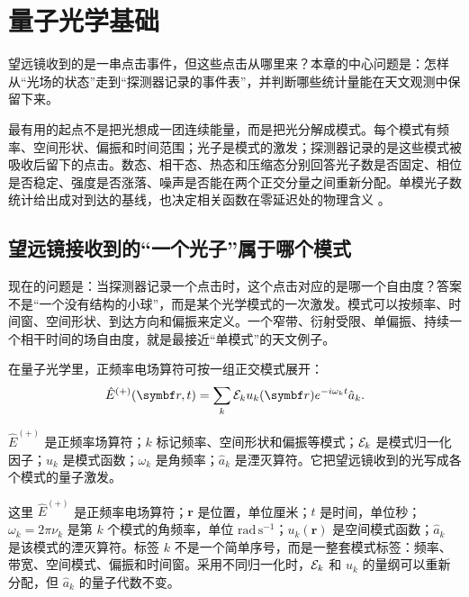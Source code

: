 \chapter{量子光学基础}
\label{chap:03}

\begin{chapteropening}
望远镜收到的是一串点击事件，但这些点击从哪里来？本章的中心问题是：怎样从“光场的状态”走到“探测器记录的事件表”，并判断哪些统计量能在天文观测中保留下来。

最有用的起点不是把光想成一团连续能量，而是把光分解成模式。每个模式有频率、空间形状、偏振和时间范围；光子是模式的激发；探测器记录的是这些模式被吸收后留下的点击。数态、相干态、热态和压缩态分别回答光子数是否固定、相位是否稳定、强度是否涨落、噪声是否能在两个正交分量之间重新分配。单模光子数统计给出成对到达的基线，也决定相关函数在零延迟处的物理含义 \citep{1963PhRv..130.2529G,1963PhRv..131.2766G,1965RvMP...37..231M,1995ocqo.book.....M,1997quop.book.....S,2001qops.book.....S,2013quop.book.....A}。
\end{chapteropening}

\section{望远镜接收到的“一个光子”属于哪个模式}

现在的问题是：当探测器记录一个点击时，这个点击对应的是哪一个自由度？答案不是“一个没有结构的小球”，而是某个光学模式的一次激发。模式可以按频率、时间窗、空间形状、到达方向和偏振来定义。一个窄带、衍射受限、单偏振、持续一个相干时间的场自由度，就是最接近“单模式”的天文例子。

在量子光学里，正频率电场算符可按一组正交模式展开：
\begin{equation}
  \hat E^{(+)}(\bm{r},t)=\sum_k {\cal E}_k u_k(\bm{r})e^{-i\omega_k t}\hat a_k .
  \label{eq:ch03-field-expansion}
\end{equation}
\begin{formulaexplain}
\(\hat E^{(+)}\) 是正频率场算符；\(k\) 标记频率、空间形状和偏振等模式；\({\cal E}_k\) 是模式归一化因子；\(u_k\) 是模式函数；\(\omega_k\) 是角频率；\(\hat a_k\) 是湮灭算符。它把望远镜收到的光写成各个模式的量子激发。
\end{formulaexplain}
这里 \(\hat E^{(+)}\) 是正频率电场算符；\(\bm r\) 是位置，单位厘米；\(t\) 是时间，单位秒；\(\omega_k=2\pi\nu_k\) 是第 \(k\) 个模式的角频率，单位 \(\mathrm{rad\,s^{-1}}\)；\(u_k(\bm r)\) 是空间模式函数；\(\hat a_k\) 是该模式的湮灭算符。标签 \(k\) 不是一个简单序号，而是一整套模式标签：频率、带宽、空间模式、偏振和时间窗。采用不同归一化时，\({\cal E}_k\) 和 \(u_k\) 的量纲可以重新分配，但 \(\hat a_k\) 的量子代数不变。

